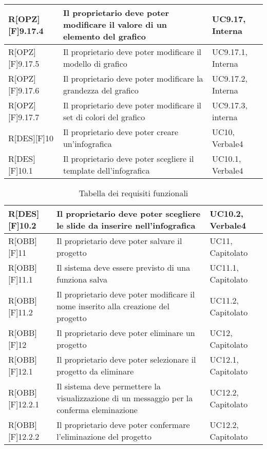 \begin{table}[h]
\begin{tabular}{|p{}|p{}|p{}|}
R[OPZ][F]9.17.4 & Il proprietario deve poter modificare il valore di un elemento del grafico & UC9.17, Interna \\ \midrule
R[OPZ][F]9.17.5 & Il proprietario deve poter modificare il modello di grafico & UC9.17.1, Interna \\ \midrule
R[OPZ][F]9.17.6 & Il proprietario deve poter modificare la grandezza del grafico & UC9.17.2, Interna \\ \midrule
R[OPZ][F]9.17.7 & Il proprietario deve poter modificare il set di colori del grafico & UC9.17.3, interna \\ \midrule
R[DES][F]10 & Il proprietario deve poter creare un'\gls{infografica} & UC10, Verbale4 \\ \midrule
R[DES][F]10.1 & Il proprietario deve poter scegliere il \gls{template} dell'\gls{infografica} & UC10.1, Verbale4 \\ \midrule

		\end{tabular}
	\end{table}
	\newpage
	
	\begin{table}[h]
		\begin{tabular}{|p{}|p{}|p{}|}
			\midrule
			
R[DES][F]10.2 & Il proprietario deve poter scegliere le \gls{slide} da inserire nell'\gls{infografica} & UC10.2, Verbale4 \\ \midrule
R[OBB][F]11 & Il proprietario deve poter salvare il progetto & UC11, Capitolato  \\ \midrule
R[OBB][F]11.1 & Il sistema deve essere previsto di una funziona salva & UC11.1, Capitolato \\ \midrule
R[OBB][F]11.2 & Il proprietario deve poter modificare il nome inserito alla creazione del progetto & UC11.2, Capitolato \\ \midrule
R[OBB][F]12 & Il proprietario deve poter eliminare un progetto & UC12, Capitolato \\ \midrule
R[OBB][F]12.1 & Il proprietario deve poter selezionare il progetto da eliminare & UC12.1, Capitolato \\ \midrule
R[OBB][F]12.2.1 & Il sistema deve permettere la visualizzazione di un messaggio per la conferma eleminazione & UC12.2, Capitolato \\ \midrule
R[OBB][F]12.2.2 & Il proprietario deve poter confermare l'eliminazione del progetto  & UC12.2, Capitolato \\ \midrule

		\end{tabular}
		\caption{Tabella dei requisiti funzionali}
	\end{table}
	\newpage


